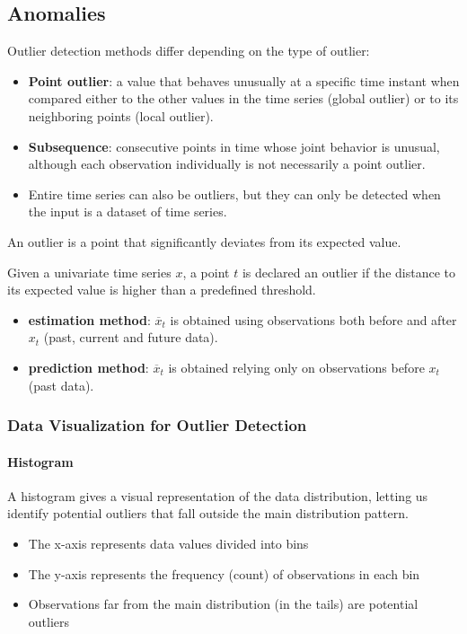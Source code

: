 \subsection{Anomalies}
Outlier detection methods differ depending on the type of outlier:
\begin{itemize}
    \item \textbf{Point outlier}: a value that behaves unusually at a specific time instant when compared either to the other values in the time series (global outlier) or to its neighboring points (local outlier).
    \item \textbf{Subsequence}: consecutive points in time whose joint behavior is unusual, although each observation individually is not necessarily a point outlier.
    \item Entire time series can also be outliers, but they can only be detected when the input is a dataset of time series.
\end{itemize}

An outlier is a point that significantly deviates from its expected value.

Given a univariate time series $x$, a point $t$ is declared an outlier if the distance to its expected value is higher than a predefined threshold.
\begin{itemize}
    \item \textbf{estimation method}: $\overline x_t$ is obtained using observations both before and after $x_t$ (past, current and future data).
    \item \textbf{prediction method}: $\overline x_t$ is obtained relying only on observations before $x_t$ (past data).
\end{itemize}

\subsubsection{Data Visualization for Outlier Detection}

\paragraph{Histogram} A histogram gives a visual representation of the data distribution, letting us identify potential outliers that fall outside the main distribution pattern.

\begin{itemize}
    \item The x-axis represents data values divided into bins
    \item The y-axis represents the frequency (count) of observations in each bin
    \item Observations far from the main distribution (in the tails) are potential outliers
\end{itemize}

